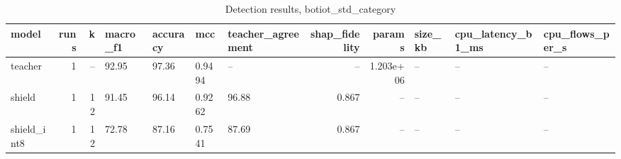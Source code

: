 \begin{table}
\caption{Detection results, botiot_std_category}
\begin{tabular}{lrrllllrrlll}
\toprule
model & runs & k & macro_f1 & accuracy & mcc & teacher_agreement & shap_fidelity & params & size_kb & cpu_latency_b1_ms & cpu_flows_per_s \\
\midrule
teacher & 1 & -- & 92.95 & 97.36 & 0.9494 & -- & -- & 1.203e+06 & -- & -- & -- \\
shield & 1 & 12 & 91.45 & 96.14 & 0.9262 & 96.88 & 0.867 & -- & -- & -- & -- \\
shield_int8 & 1 & 12 & 72.78 & 87.16 & 0.7541 & 87.69 & 0.867 & -- & -- & -- & -- \\
\bottomrule
\end{tabular}
\end{table}
